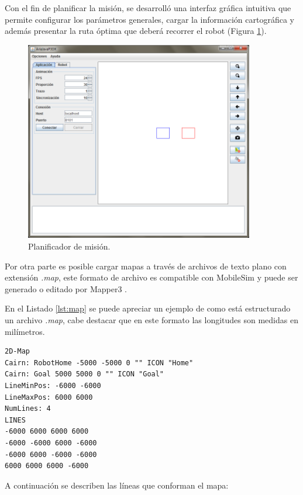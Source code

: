 \documentclass[11pt,twoside,A5]{article}
\newcommand{\reflistings}[1]{Listado \ref{#1}}
\newcommand{\reffigure}[1]{Figura \ref{#1}}
\newcommand{\refpfigure}[1]{(\reffigure{#1})}
\begin{document}
Con el fin de planificar la misión, se desarrolló una interfaz gráfica intuitiva que permite configurar
los parámetros generales, cargar la información cartográfica y además presentar la ruta óptima que deberá recorrer el robot \refpfigure{fig:planificador}. 

\begin{figure}[here]
\begin{center}
\includegraphics[width=10cm]{ventana-principal.png} 
\caption{Planificador de misión.}
\label{fig:planificador}
\end{center}
\end{figure} 

Por otra parte es posible cargar mapas a través de archivos de texto plano con extensión \textit{.map}, 
este formato de archivo es compatible con MobileSim y puede ser generado o editado por
Mapper3 \cite{mapper2014}.

En el \reflistings{lst:map} se puede apreciar un ejemplo de como está estructurado un archivo \textit{.map},
cabe destacar que en este formato las longitudes son medidas en milímetros.

\begin{minipage}{\linewidth}
\begin{lstlisting}[caption={Ejemplo archivo mapa.}, label=lst:map]
2D-Map
Cairn: RobotHome -5000 -5000 0 "" ICON "Home"
Cairn: Goal 5000 5000 0 "" ICON "Goal" 
LineMinPos: -6000 -6000
LineMaxPos: 6000 6000
NumLines: 4
LINES
-6000 6000 6000 6000
-6000 -6000 6000 -6000
-6000 6000 -6000 -6000
6000 6000 6000 -6000
\end{lstlisting}
\end{minipage}

A continuación se describen las líneas que conforman el mapa:
\end{document}

